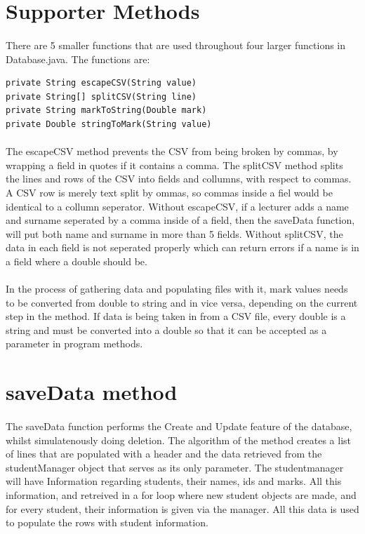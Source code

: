 \section{Supporter Methods}

\paragraph{}
There are 5 smaller functions that are used throughout four larger functions in Database.java.
The functions are:
\begin{verbatim}
private String escapeCSV(String value)
private String[] splitCSV(String line)
private String markToString(Double mark)
private Double stringToMark(String value)
\end{verbatim}

\paragraph{}
The escapeCSV method prevents the CSV from being broken by commas, by wrapping a field in 
quotes if it contains a comma. The splitCSV method splits the lines and rows of the CSV
into fields and collumns, with respect to commas. A CSV row is merely text split by ommas, so 
commas inside a fiel would be identical to a collumn seperator. Without escapeCSV, if a lecturer adds a name and surname seperated by a comma inside of a field,
then the saveData function, will put both name and surname in more than 5 fields. 
Without splitCSV, the data in each field is not seperated properly which can return errors if a name 
is in a field where a double should be.

\paragraph{}
In the process of gathering data and populating files with it, mark values needs to be 
converted from double to string and in vice versa, depending on the current step in the method.
If data is being taken in from a CSV file, every double is a string and must be converted into a double 
so that it can be accepted as a parameter in program methods.

\section{saveData method}
\paragraph{}
The saveData function performs the Create and Update feature of the database, whilst simulatenously doing deletion.
The algorithm of the method creates a list of lines that are populated with a header and the data 
retrieved from the studentManager object that serves as its only parameter. The studentmanager will have Information 
regarding students, their names, ids and marks. All this information, and retreived in a for loop where 
new student objects are made, and for every student, their information is given via the manager.
All this data is used to populate the rows with student information.

